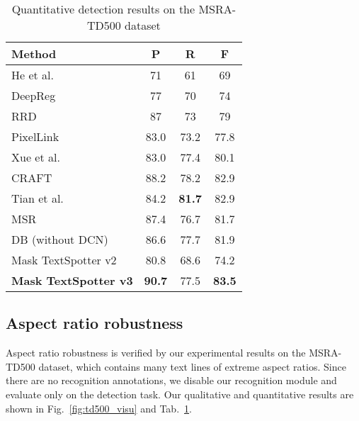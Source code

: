 \documentclass[runningheads]{llncs}
\begin{document}
\begin{table}[ht]
    \setlength{\tabcolsep}{11.0pt}
    \centering
    \caption{Quantitative detection results on the MSRA-TD500 dataset}
    \begin{tabularx}{0.72\linewidth}{lccc}
    \toprule
    Method        & P             & R             & F                   \\ 
    \midrule
    He et al.~\cite{he2016text}        & 71            & 61            & 69              \\ 
    DeepReg~\cite{deepdirect}     & 77            & 70            & 74                \\ 
    RRD~\cite{liao2018rotation}          & 87            & 73            & 79                   \\ 
    PixelLink~\cite{deng2018pixellink}    & 83.0            & 73.2          & 77.8                   \\ 
    Xue et al.~\cite{xue2018accurate}        & 83.0          & 77.4          & 80.1                \\ 
    CRAFT~\cite{craft}        & 88.2          & 78.2          & 82.9                \\ 
    Tian et al.~\cite{tian2019learning}       & 84.2          & \textbf{81.7}          & 82.9               \\ 
    MSR~\cite{tian2019learning}       & 87.4          & 76.7          & 81.7              \\ 
    DB (without DCN)~\cite{LiaoWYCB20}       & 86.6            & 77.7          & 81.9              \\ 
    Mask TextSpotter v2~\cite{liao2019mask} & 80.8         & 68.6         & 74.2           \\ 
    \hline
    \textbf{Mask TextSpotter v3} & \textbf{90.7} & 77.5 & \textbf{83.5}           \\ 
    \bottomrule
    \end{tabularx}
    \label{tab:td500}
\end{table}

\subsection{Aspect ratio robustness}
Aspect ratio robustness is verified by our experimental results on the MSRA-TD500 dataset, which contains many text lines of extreme aspect ratios. Since there are no recognition annotations, we disable our recognition module and evaluate only on the detection task. Our qualitative and quantitative results are shown in Fig.~\ref{fig:td500_visu} and Tab.~\ref{tab:td500}. 
\end{document}
